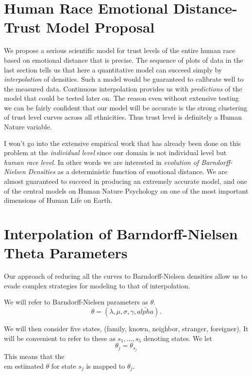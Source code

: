 \documentclass{amsart}
\begin{document}
\section{Human Race Emotional Distance-Trust Model Proposal}

We propose a serious scientific model for trust levels of the entire human race based on emotional distance that is precise.  The sequence of plots of data in the last section tells us that here a quantitative model can succeed simply by {\em interpolation} of densities.  Such a model would be guaranteed to calibrate well to the measured data.  Continuous interpolation provides us with {\em predictions} of the model that could be tested later on.  The reason even without extensive testing we can be fairly confident that our model will be accurate is the strong clustering of trust level curves across all ethnicities.  Thus trust level is definitely a Human Nature variable.

I won't go into the extensive empirical work that has already been done on this problem at the {\em individual level} since our domain is not individual level but {\em human race level}.  In other words we are interested in {\em evolution of Barndorff-Nielsen Densities} as a deterministic function of emotional distance.  We are almost guaranteed to succeed in producing an extremely accurate model, and one of the central models on Human Nature Psychology on one of the most important dimensions of Human Life on Earth.

\section{Interpolation of Barndorff-Nielsen Theta Parameters}

Our approach of reducing all the curves to Barndorff-Nielsen densities allow us to evade complex strategies for modeling to that of interpolation.

We will refer to Barndorff-Nielsen parameters as $\theta$.  
\begin{equation}
\theta = (\lambda, \mu, \sigma, \gamma, \bar{alpha}).
\end{equation}

We will then consider five states, (family, known, neighbor, stranger, foreigner).  It will be convenient to refer to these as $s_1,\dots,s_5$ denoting states.  We let
\[
\theta_j = \theta_{s_j}
\]
This means that the {\\em estimated $\theta$ for state $s_j$ is mapped to $\theta_j$.}
\end{document}

